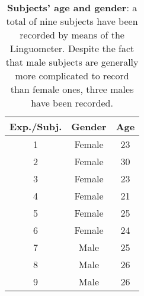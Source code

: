 \begin{table}[ht!]
  \begin{center}
  \begin{scriptsize}
	\begin{tabular}{|c|c|c|}
	  \hline
	  \textbf{Exp./Subj.} & \textbf{Gender} & \textbf{Age}\\
	  \hline
	  1 & Female & 23\\
	  2 & Female & 30\\
	  3 & Female & 23\\
	  4 & Female & 21\\
	  5 & Female & 25\\
	  6 & Female & 24\\
	  7 & Male & 25\\
	  8 & Male & 26\\
	  9 & Male & 26\\
	  \hline
  \end{tabular}
  \end{scriptsize}
  \end{center}
	\caption[Subjects' age and gender]{\textbf{Subjects' age and gender}: 
	a total of nine subjects have been recorded by means of the Linguometer.
	Despite the fact that male subjects are generally more complicated to record
	than female ones, three males have been recorded.}
 \label{tab:experiments:subjects}
\end{table}
